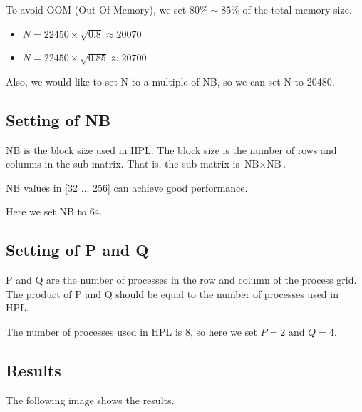\documentclass{article}
\begin{document}
To avoid OOM (Out Of Memory), we set $80\% \sim 85\%$ of the total memory size.

\begin{itemize}
    \item $N = 22450 \times \sqrt{0.8} \approx 20070$
    \item $N = 22450 \times \sqrt{0.85} \approx 20700$
\end{itemize}

Also, we would like to set N to a multiple of NB, so we can set N to 20480.

\subsection*{Setting of NB}

NB is the block size used in HPL. The block size is the number of rows and columns in the sub-matrix. That is, the sub-matrix is $\text{NB} \times \text{NB}$.

\vspace{1em}

NB values in [32 ... 256] can achieve good performance.

\vspace{1em}

Here we set NB to 64.

\subsection*{Setting of P and Q}

P and Q are the number of processes in the row and column of the process grid. The product of P and Q should be equal to the number of processes used in HPL.

\vspace{1em}

The number of processes used in HPL is 8, so here we set $P = 2$ and $Q = 4$.

\subsection*{Results}

The following image shows the results.
\end{document}
